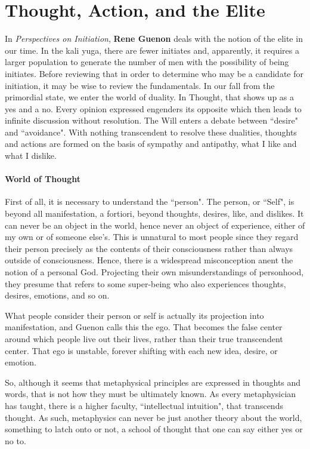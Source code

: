 \section{Thought, Action, and the Elite}

In \textit{Perspectives on Initiation}, \textbf{Rene Guenon} deals with the notion of the elite in our time. In the kali yuga, there are fewer initiates and, apparently, it requires a larger population to generate the number of men with the possibility of being initiates. Before reviewing that in order to determine who may be a candidate for initiation, it may be wise to review the fundamentals. In our fall from the primordial state, we enter the world of duality. In Thought, that shows up as a yes and a no. Every opinion expressed engenders its opposite which then leads to infinite discussion without resolution. The Will enters a debate between ``desire" and ``avoidance". With nothing transcendent to resolve these dualities, thoughts and actions are formed on the basis of sympathy and antipathy, what I like and what I dislike.

\paragraph{World of Thought}
First of all, it is necessary to understand the ``person". The person, or ``Self", is beyond all manifestation, a fortiori, beyond thoughts, desires, like, and dislikes. It can never be an object in the world, hence never an object of experience, either of my own or of someone else's. This is unnatural to most people since they regard their person precisely as the contents of their consciousness rather than always outside of consciousness. Hence, there is a widespread misconception anent the notion of a personal God. Projecting their own misunderstandings of personhood, they presume that refers to some super-being who also experiences thoughts, desires, emotions, and so on.

What people consider their person or self is actually its projection into manifestation, and Guenon calls this the ego. That becomes the false center around which people live out their lives, rather than their true transcendent center. That ego is unstable, forever shifting with each new idea, desire, or emotion.

So, although it seems that metaphysical principles are expressed in thoughts and words, that is not how they must be ultimately known. As every metaphysician has taught, there is a higher faculty, ``intellectual intuition", that transcends thought. As such, metaphysics can never be just another theory about the world, something to latch onto or not, a school of thought that one can say either yes or no to.


